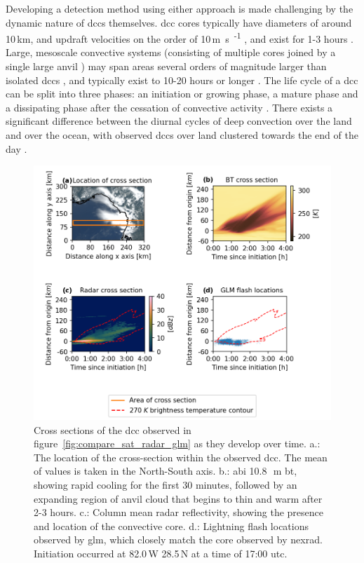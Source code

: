 Developing a detection method using either approach is made challenging by the dynamic nature of \acrshort{dcc}s themselves.
\acrshort{dcc} cores typically have diameters of around 10\,\unit{km}, and updraft velocities on the order of 10\,\unit{m s\textsuperscript{-1}} \citep{weisman_mesoscale_2015}, and exist for 1-3 hours \citep{chen_diurnal_1997}.
Large, mesoscale convective systems (consisting of multiple cores joined by a single large anvil \citep{roca_simple_2017}) may span areas several orders of magnitude larger than isolated \acrshort{dcc}s \citep{houze_mesoscale_2004}, and typically exist to 10-20 hours or longer \citep{chen_diurnal_1997}.
The life cycle of a \acrshort{dcc} can be split into three phases: an initiation or growing phase, a mature phase and a dissipating phase after the cessation of convective activity \citep{wall_life_2018}.
There exists a significant difference between the diurnal cycles of deep convection over the land and over the ocean, with observed \acrshort{dcc}s over land clustered towards the end of the day \citep{taylor_evaluating_2017}.


\begin{figure}[tp]
    \includegraphics[width=\textwidth]{figures/chapter1_02.png}
    \caption[
    Cross sections of the \acrshort{dcc} observed in figure~\ref{fig:compare_sat_radar_glm} as they develop over time
    ]{
    Cross sections of the \acrshort{dcc} observed in figure~\ref{fig:compare_sat_radar_glm} as they develop over time. a.: The location of the cross-section within the observed \acrshort{dcc}. The mean of values is taken in the North-South axis. b.: \acrshort{abi} 10.8\,\unit{\mu m} \acrshort{bt}, showing rapid cooling for the first 30 minutes, followed by an expanding region of anvil cloud that begins to thin and warm after 2-3 hours. c.: Column mean radar reflectivity, showing the presence and location of the convective core. d.: Lightning flash locations observed by \acrshort{glm}, which closely match the core observed by \acrshort{nexrad}. Initiation occurred at 82.0\,\textdegree W 28.5\,\textdegree N at a time of 17:00 \acrshort{utc}.
    }
    \label{fig:dcc_over_time}
\end{figure}


